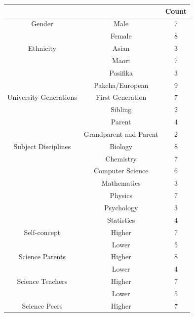 \documentclass[a4paper,man,natbib]{apa6}
\begin{document}
\begin{table}[]
\begin{tabular}{cc|c}
                       &                        & Count \\ \hline
Gender                 & Male                   & 7     \\
                       & Female                 & 8     \\ \hline
Ethnicity              & Asian                  & 3     \\
                       & M\={a}ori                  & 7     \\
                       & Pasifika               & 3     \\
                       & Pakeha/European        & 9     \\ \hline
University Generations & First Generation       & 7     \\
                       & Sibling                & 2     \\
                       & Parent                 & 4     \\
                       & Grandparent and Parent & 2     \\ \hline
Subject Disciplines    & Biology                & 8     \\
                       & Chemistry              & 7     \\
                       & Computer Science       & 6     \\
                       & Mathematics            & 3     \\
                       & Physics                & 7     \\
                       & Psychology             & 3     \\
                       & Statistics             & 4     \\ \hline
Self-concept          & Higher                   & 7     \\
                       & Lower                    & 5     \\ \hline
Science Parents        & Higher                   & 8     \\
                       & Lower                    & 4     \\ \hline
Science Teachers       & Higher                   & 7     \\
                       & Lower                    & 5     \\ \hline
Science Peers          & Higher                   & 7     \\

\end{tabular}
\end{table}
\end{document}
